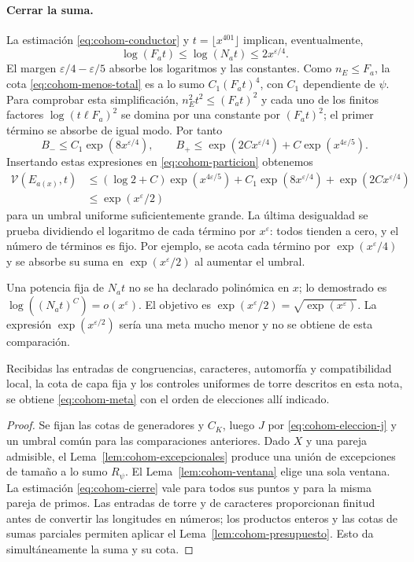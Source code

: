 \paragraph{Cerrar la suma.}
La estimación \eqref{eq:cohom-conductor} y
$t=\lfloor x^{401}\rfloor$ implican, eventualmente,
\[
 \log(F_at)\le\log(N_at)\le2x^{\varepsilon/4}.
\]
El margen $\varepsilon/4-\varepsilon/5$ absorbe
los logaritmos y las constantes.
Como $n_E\le F_a$, la cota
\eqref{eq:cohom-menos-total} es a lo sumo
$C_1(F_at)^4$, con $C_1$ dependiente de $\psi$.
Para comprobar esta simplificación, $n_E^2t^2\le(F_at)^2$
y cada uno de los finitos factores
$\log(t\ell F_a)^2$ se domina por una constante por
$(F_at)^2$; el primer término se absorbe de igual modo.
Por tanto
\[
 B_-\le C_1\exp(8x^{\varepsilon/4}),\qquad
 B_+\le\exp(2Cx^{\varepsilon/4})
                  +C\exp(x^{4\varepsilon/5}).
\]
Insertando estas expresiones en
\eqref{eq:cohom-particion} obtenemos
\begin{equation}
 \begin{split}
 \mathcal V(E_{a(x)},t)
 &\le(\log2+C)\exp(x^{4\varepsilon/5})
       +C_1\exp(8x^{\varepsilon/4})
       +\exp(2Cx^{\varepsilon/4})\\
 &\le\exp(x^\varepsilon/2)
 \end{split}
 \label{eq:cohom-cierre}
\end{equation}
para un umbral uniforme suficientemente grande.
La última desigualdad se prueba dividiendo el logaritmo
de cada término por $x^\varepsilon$:
todos tienden a cero, y el número de términos es fijo.
Por ejemplo, se acota cada término por
$\exp(x^\varepsilon/4)$ y se absorbe su suma en
$\exp(x^\varepsilon/2)$ al aumentar el umbral.

Una potencia fija de $N_at$ no se ha declarado
polinómica en $x$; lo demostrado es
$\log((N_at)^C)=o(x^\varepsilon)$.
El objetivo es
$\exp(x^\varepsilon/2)=\sqrt{\exp(x^\varepsilon)}$.
La expresión $\exp(x^{\varepsilon/2})$ sería una meta
mucho menor y no se obtiene de esta comparación.

\begin{proposicion}
\label{prop:cohom-ventana-aritmetica}
Recibidas las entradas de congruencias, caracteres,
automorfía y compatibilidad local, la cota de capa fija
y los controles uniformes de torre descritos en esta
nota, se obtiene \eqref{eq:cohom-meta} con el orden de
elecciones allí indicado.
\end{proposicion}

\begin{proof}
Se fijan las cotas de generadores y $C_K$, luego $J$
por \eqref{eq:cohom-eleccion-j} y un umbral común
para las comparaciones anteriores.
Dado $X$ y una pareja admisible, el
Lema~\ref{lem:cohom-excepcionales} produce una unión
de excepciones de tamaño a lo sumo $R_\psi$.
El Lema~\ref{lem:cohom-ventana} elige una sola ventana.
La estimación \eqref{eq:cohom-cierre} vale para todos
sus puntos y para la misma pareja de primos.
Las entradas de torre y de caracteres proporcionan
finitud antes de convertir las longitudes en números;
los productos enteros y las cotas de sumas parciales
permiten aplicar el Lema~\ref{lem:cohom-presupuesto}.
Esto da simultáneamente la suma y su cota.
\end{proof}

